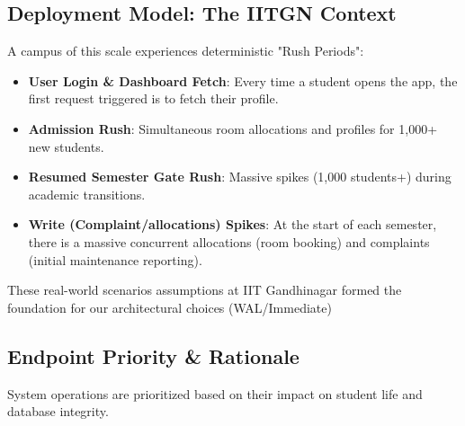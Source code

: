 \documentclass[sigconf]{acmart}
\begin{document}
\subsection{Deployment Model: The IITGN Context}
A campus of this scale experiences deterministic "Rush Periods":

\begin{itemize}[leftmargin=*]
     \item \textbf{User Login \& Dashboard Fetch}: Every time a student opens the app, the first request triggered is to fetch their profile.
    \item \textbf{Admission Rush}: Simultaneous room allocations and profiles for 1,000+ new students.
    \item \textbf{Resumed Semester Gate Rush}: Massive spikes (1,000 students+) during academic transitions.
    \item \textbf{Write (Complaint/allocations) Spikes}: At the start of each semester, there is a massive concurrent allocations (room booking) and complaints (initial maintenance reporting).

\end{itemize}
These real-world scenarios assumptions at IIT Gandhinagar formed the foundation for our architectural choices (WAL/Immediate)

\subsection{Endpoint Priority \& Rationale}
System operations are prioritized based on their impact on student life and database integrity.
\end{document}
